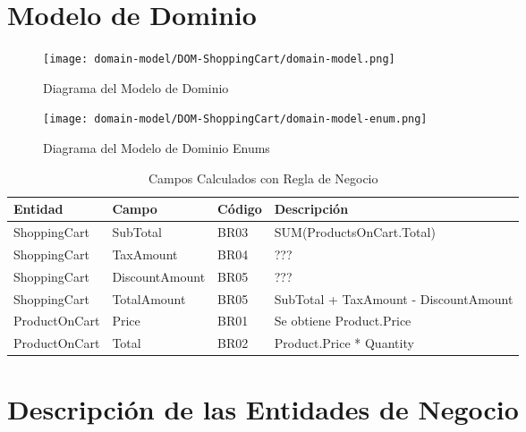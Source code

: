 \clearpage
\section{Modelo de Dominio} \label{sec:dom-shoppingcart}
\begin{figure}[H]
\begin{center}
	\label{tab:uml-domain-model}
	\texttt{[image: domain-model/DOM-ShoppingCart/domain-model.png]}
	\caption{Diagrama del Modelo de Dominio}
\end{center}
\end{figure}
\begin{figure}[H]
		\begin{center}
			\label{tab:uml-domain-model}
			\texttt{[image: domain-model/DOM-ShoppingCart/domain-model-enum.png]}
			\caption{Diagrama del Modelo de Dominio Enums}
		\end{center}
\end{figure}
\begin{table}[H]
			\caption{Campos Calculados con Regla de Negocio}
			\label{tab:entities}
			\begin{center}
			\begin{tabularx}{0.90\linewidth}{ X X X X}
				\hline
				\textbf{Entidad} & \textbf{Campo} & \textbf{C\'odigo} & \textbf{Descripci\'on} \\
				\hline
ShoppingCart &SubTotal &BR03&SUM(ProductsOnCart.Total) \\
ShoppingCart &TaxAmount &BR04&??? \\
ShoppingCart &DiscountAmount &BR05&??? \\
ShoppingCart &TotalAmount &BR05&SubTotal + TaxAmount - DiscountAmount \\
ProductOnCart &Price &BR01&Se obtiene Product.Price \\
ProductOnCart &Total &BR02&Product.Price * Quantity \\
				\hline
			\end{tabularx}
			\end{center}
\end{table}

\clearpage
\section{Descripci\'on de las Entidades de Negocio} \label{sec:dom-entities-shoppingcart}

